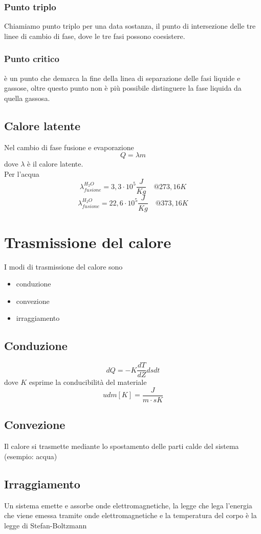 \documentclass[a4paper]{report}
\begin{document}
  \subsubsection{Punto triplo}
  Chiamiamo punto triplo per una data sostanza, il punto di intersezione delle tre linee di cambio di fase, dove le tre fasi possono coesistere.
  \subsubsection{Punto critico}
  è un punto che demarca la fine della linea di separazione delle fasi liquide e gassose, oltre questo punto non è più possibile distinguere la fase liquida da quella gassosa.
  \subsection{Calore latente}
  Nel cambio di fase fusione e evaporazione
  \[ Q = \lambda m\]
  dove $\lambda$ è il calore latente.\\
  Per l'acqua
  \[ \lambda_{fusione}^{H_2O} = 3,3 \cdot 10^5 \frac{J}{Kg} \quad @ 273,16 K \]
  \[ \lambda_{fusione}^{H_2O} = 22,6 \cdot 10^5 \frac{J}{Kg} \quad @ 373,16K \]

  \section{Trasmissione del calore}
  I modi di trasmissione del calore sono
  \begin{itemize}
    \item conduzione
    \item convezione
    \item irraggiamento
  \end{itemize}
  \subsection{Conduzione}
  \[ dQ = -K \frac{dT}{dZ} ds dt \]
  dove $K$ esprime la conducibilità del materiale
  \[ udm[K] = \frac{J}{m\cdot sK} \]
  \subsection{Convezione}
  Il calore si trasmette mediante lo spostamento delle parti calde del sistema (esempio: acqua)
  \subsection{Irraggiamento}
  Un sistema emette e assorbe onde elettromagnetiche, la legge che lega l'energia che viene emessa tramite onde elettromagnetiche e la temperatura del corpo è la legge di Stefan-Boltzmann
\end{document}
